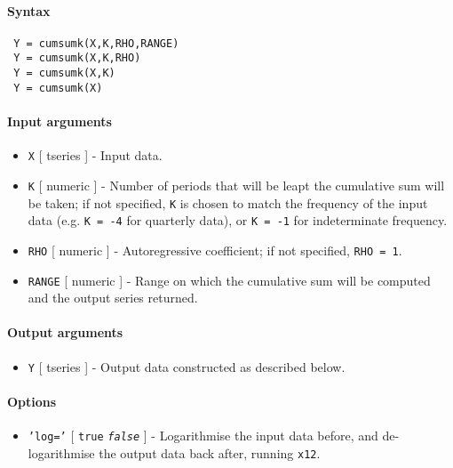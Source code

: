 


	\paragraph{Syntax}
 
 \begin{verbatim}
 Y = cumsumk(X,K,RHO,RANGE)
 Y = cumsumk(X,K,RHO)
 Y = cumsumk(X,K)
 Y = cumsumk(X)
 \end{verbatim}
 
 \paragraph{Input arguments}
 
 \begin{itemize}
 \item
   \texttt{X} {[} tseries {]} - Input data.
 \item
   \texttt{K} {[} numeric {]} - Number of periods that will be leapt the
   cumulative sum will be taken; if not specified, \texttt{K} is chosen
   to match the frequency of the input data (e.g. \texttt{K = -4} for
   quarterly data), or \texttt{K = -1} for indeterminate frequency.
 \item
   \texttt{RHO} {[} numeric {]} - Autoregressive coefficient; if not
   specified, \texttt{RHO = 1}.
 \item
   \texttt{RANGE} {[} numeric {]} - Range on which the cumulative sum
   will be computed and the output series returned.
 \end{itemize}
 
 \paragraph{Output arguments}
 
 \begin{itemize}
 \item
   \texttt{Y} {[} tseries {]} - Output data constructed as described
   below.
 \end{itemize}
 
 \paragraph{Options}
 
 \begin{itemize}
 \item
   \texttt{'log='} {[} \texttt{true} \textbar{} \emph{\texttt{false}} {]}
   - Logarithmise the input data before, and de-logarithmise the output
   data back after, running \texttt{x12}.
 \end{itemize}
 
